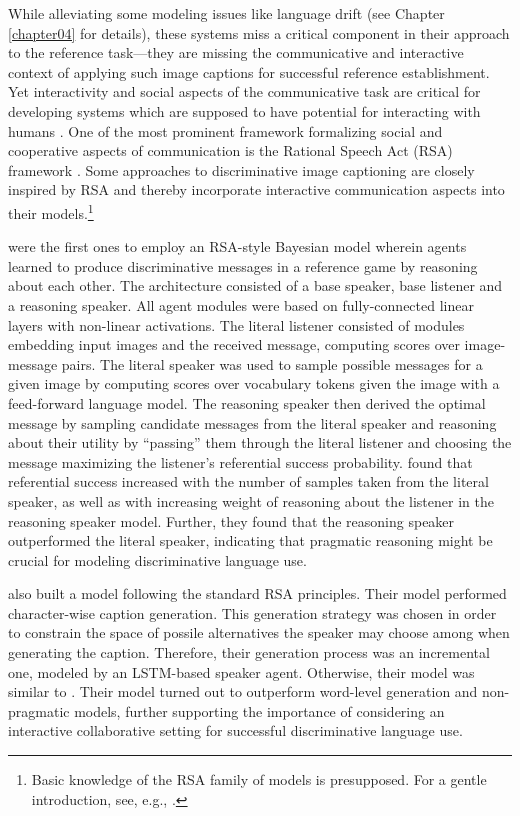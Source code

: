 While alleviating some modeling issues like language drift (see Chapter \ref{chapter04} for details), these systems miss a critical component in their approach to the reference task---they are missing the communicative and interactive context of applying such image captions for successful reference establishment. Yet interactivity and social aspects of the communicative task are critical for developing systems which are supposed to have potential for interacting with humans \parencite{lazaridou2020emergent}. One of the most prominent framework formalizing social and cooperative aspects of communication is the Rational Speech Act (RSA) framework \parencite{goodman2016pragmatic}. Some approaches to discriminative image captioning are closely inspired by RSA and thereby incorporate interactive communication aspects into their models.\footnote{Basic knowledge of the RSA family of models is presupposed. For a gentle introduction, see, e.g., \cite{goodman2016pragmatic, problang}.}

\cite{andreas2016reasoning} were the first ones to employ an RSA-style Bayesian model wherein agents learned to produce discriminative messages in a reference game by reasoning about each other. The architecture consisted of a base speaker, base listener and a reasoning speaker. All agent modules were based on fully-connected linear layers with non-linear activations. The literal listener consisted of modules embedding input images and the received message, computing scores over image-message pairs. The literal speaker was used to sample possible messages for a given image by computing scores over vocabulary tokens given the image with a feed-forward language model. The reasoning speaker then derived the optimal message by sampling candidate messages from the literal speaker and reasoning about their utility by ``passing'' them through the literal listener and choosing the message maximizing the listener's referential success probability. 
\cite{andreas2016reasoning} found that referential success increased with the number of samples taken from the literal speaker, as well as with increasing weight of reasoning about the listener in the reasoning speaker model. Further, they found that the reasoning speaker outperformed the literal speaker, indicating that pragmatic reasoning might be crucial for modeling discriminative language use. 

\cite{cohn2018pragmatically} also built a model following the standard RSA principles. Their model performed character-wise caption generation. This generation strategy was chosen in order to constrain the space of possile alternatives the speaker may choose among when generating the caption. Therefore, their generation process was an incremental one, modeled by an LSTM-based speaker agent. Otherwise, their model was similar to \cite{andreas2016reasoning}. Their model  turned out to outperform word-level generation and non-pragmatic models, further supporting the importance of considering an interactive collaborative setting for successful discriminative language use.

